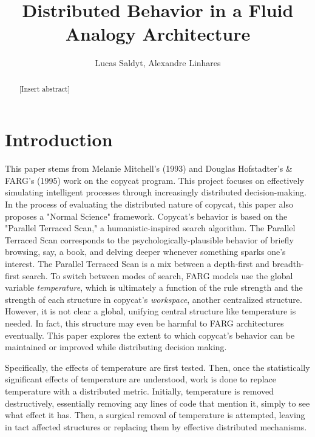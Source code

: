 \documentclass[a4paper]{article}
\title{Distributed Behavior in a Fluid Analogy Architecture}
\author{Lucas Saldyt, Alexandre Linhares}
\begin{document}
\maketitle

\begin{abstract}
    [Insert abstract]
\end{abstract}

\section{Introduction}

This paper stems from Melanie Mitchell's (1993) and Douglas Hofstadter's \& FARG's (1995) work on the copycat program. 
This project focuses on effectively simulating intelligent processes through increasingly distributed decision-making.
In the process of evaluating the distributed nature of copycat, this paper also proposes a "Normal Science" framework. 
Copycat's behavior is based on the "Parallel Terraced Scan," a humanistic-inspired search algorithm.
The Parallel Terraced Scan corresponds to the psychologically-plausible behavior of briefly browsing, say, a book, and delving deeper whenever something sparks one's interest. 
The Parallel Terraced Scan is a mix between a depth-first and breadth-first search.
To switch between modes of search, FARG models use the global variable \emph{temperature}, which is ultimately a function of the rule strength and the strength of each structure in copycat's \emph{workspace}, another centralized structure.
However, it is not clear a global, unifying central structure like temperature is needed.
In fact, this structure may even be harmful to FARG architectures eventually.
This paper explores the extent to which copycat's behavior can be maintained or improved while distributing decision making.

Specifically, the effects of temperature are first tested. 
Then, once the statistically significant effects of temperature are understood, work is done to replace temperature with a distributed metric.
Initially, temperature is removed destructively, essentially removing any lines of code that mention it, simply to see what effect it has.
Then, a surgical removal of temperature is attempted, leaving in tact affected structures or replacing them by effective distributed mechanisms.
\end{document}

